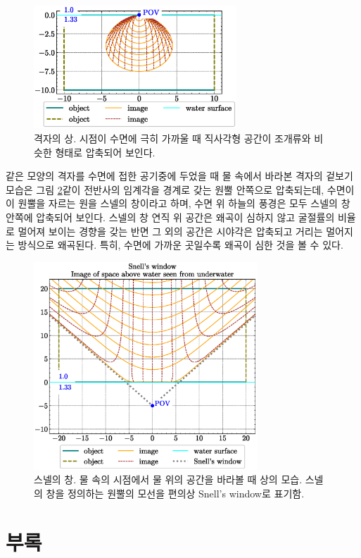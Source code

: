 \documentclass[twocolumn]{article}
\begin{document}
\begin{figure}
	\centering
	\includegraphics[width=3in]{figs/seashell_shape.eps}
	\caption{격자의 상.  시점이 수면에 극히 가까울 때 직사각형 공간이 조개류와 비슷한 형태로 압축되어 보인다.}
	\label{fig:seashell}
\end{figure}

같은 모양의 격자를 수면에 접한 공기중에 두었을 때 물 속에서 바라본 격자의 겉보기 모습은 그림 \ref{fig:snell_window}\과 같이 전반사의 임계각을 경계로 갖는 원뿔 안쪽으로 압축되는데, 수면이 이 원뿔을 자르는 원을 스넬의 창이라고 하며, 수면 위 하늘의 풍경은 모두 스넬의 창 안쪽에 압축되어 보인다. 스넬의 창 연직 위 공간은 왜곡이 심하지 않고 굴절률의 비율로 멀어져 보이는 경향을 갖는 반면 그 외의 공간은 시야각은 압축되고 거리는 멀어지는 방식으로 왜곡된다. 특히, 수면에 가까운 곳일수록 왜곡이 심한 것을 볼 수 있다.

\begin{figure}
	\centering
	\includegraphics[width=3.3in]{figs/snell_window.eps}
	\caption{스넬의 창. 물 속의 시점에서 물 위의 공간을 바라볼 때 상의 모습. 스넬의 창을 정의하는 원뿔의 모선을 편의상 Snell's window로 표기함.}
	\label{fig:snell_window}
\end{figure}

\appendix
\section*{부록}
\newcommand{\pd}[2]{{\frac{\partial #1}{\partial #2}}}
\newcommand{\ilpd}[2]{{{\partial #1}/{\partial #2}}}
\end{document}
